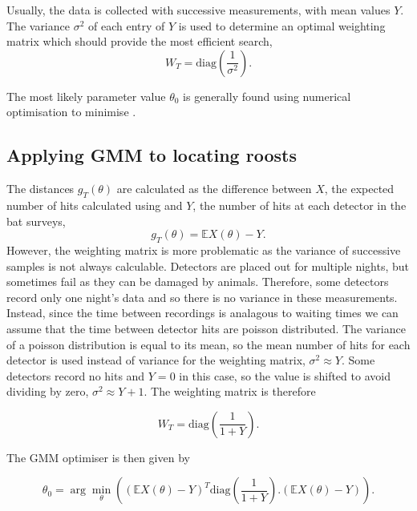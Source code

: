 Usually, the data is collected with successive measurements, with mean values $Y$. The variance $\sigma^2$ of each entry of $Y$ is used to determine an optimal weighting matrix which should provide the most efficient search,
%
\begin{equation}
W_T = \textrm{diag} \left(\frac{1}{\sigma^2} \right) .
\end{equation}

The most likely parameter value $\theta_0$ is generally found using numerical optimisation to minimise .

\subsection{Applying GMM to locating roosts}

The distances $g_T(\theta)$ are calculated as the difference between $X$, the expected number of hits calculated using  and $Y$, the number of hits at each detector in the bat surveys,
%
\begin{equation}
g_T(\theta) = \mathbb{E}X(\theta) - Y .
\end{equation}
%
However, the weighting matrix is more problematic as the variance of successive samples is not always calculable. Detectors are placed out for multiple nights, but sometimes fail as they can be damaged by animals. Therefore, some detectors record only one night's data and so there is no variance in these measurements. Instead, since the time between recordings is analagous to waiting times we can assume that the time between detector hits are poisson distributed. The variance of a poisson distribution is equal to its mean, so the mean number of hits for each detector is used instead of variance for the weighting matrix, $\sigma^2 \approx Y$. Some detectors record no hits and $Y=0$ in this case, so the value is shifted to avoid dividing by zero, $\sigma^2 \approx Y+1$. The weighting matrix is therefore

\begin{equation}
W_T = \textrm{diag} \left(\frac{1}{1+Y} \right) .
\label{eqn:weighting}
\end{equation}

The GMM optimiser is then given by

\begin{equation}
\theta_0 = \arg \min_{\theta} \left( (\mathbb{E}X(\theta) - Y)^T\textrm{diag} \left(\frac{1}{1+Y} \right) .(\mathbb{E}X(\theta) - Y) \right) .
\label{eqn:roost_gmm}
\end{equation}

